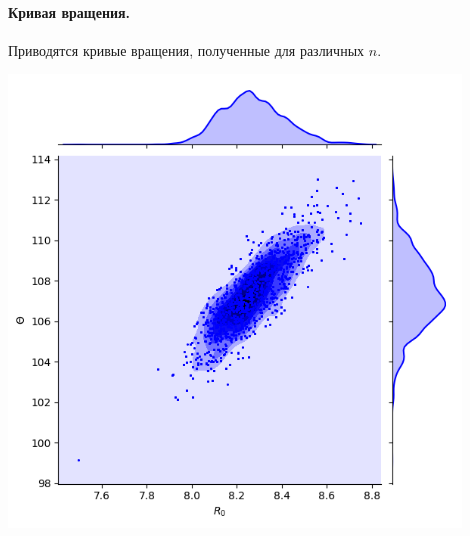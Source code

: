 \documentclass{matmex-diploma-custom}
\begin{document}
\pagebreak
\paragraph{Кривая вращения.} Приводятся кривые вращения, полученные для различных $n$. 

        \includegraphics[width=0.9\textwidth]{../../sources/scripts/out.png}
\pagebreak
\end{document}
